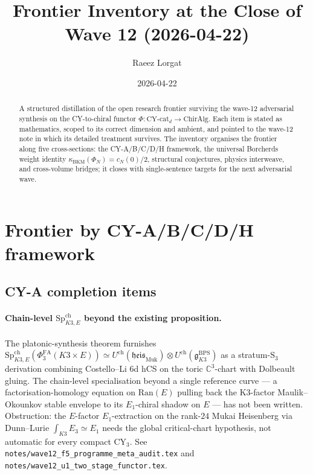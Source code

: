 \documentclass[11pt]{article}
\title{Frontier Inventory at the Close of Wave 12 (2026-04-22)}
\author{Raeez Lorgat}
\date{2026-04-22}
\providecommand{\C}{\mathbb{C}}
\providecommand{\Sp}{\mathrm{Sp}}
\providecommand{\kBKM}{\kappa_{\mathrm{BKM}}}
\providecommand{\Eone}{E_1}
\providecommand{\Ethree}{E_3}
\providecommand{\fg}{\mathfrak{g}}
\providecommand{\fheis}{\mathfrak{heis}}
\providecommand{\Phifa}{\Phi^{\mathrm{FA}}}
\begin{document}
\maketitle

\begin{abstract}
A structured distillation of the open research frontier surviving the
wave-12 adversarial synthesis on the CY-to-chiral functor $\Phi:
\mathrm{CY}\text{-cat}_d \to \mathrm{ChirAlg}$. Each item is stated
as mathematics, scoped to its correct dimension and ambient, and
pointed to the wave-12 note in which its detailed treatment survives.
The inventory organises the frontier along five cross-sections:
the CY-A/B/C/D/H framework, the universal Borcherds weight identity
$\kBKM(\Phi_N) = c_N(0)/2$, structural conjectures, physics interweave,
and cross-volume bridges; it closes with single-sentence targets for
the next adversarial wave.
\end{abstract}

\section{Frontier by CY-A/B/C/D/H framework}

\subsection{CY-A completion items}

\paragraph{Chain-level $\Sp^{\mathrm{ch}}_{K3, E}$ beyond the existing
proposition.} The platonic-synthesis theorem furnishes
$\Sp^{\mathrm{ch}}_{K3, E}(\Phifa_3(K3 \times E)) \simeq
U^{\mathrm{ch}}(\fheis_{\mathrm{Muk}}) \otimes U^{\mathrm{ch}}(\fg^{\mathrm{BPS}}_{K3})$
as a stratum-$\mathrm{S}_3$ derivation combining Costello--Li 6d hCS on
the toric $\C^3$-chart with Dolbeault gluing. The chain-level
specialisation beyond a single reference curve --- a factorisation-homology
equation on $\mathrm{Ran}(E)$ pulling back the K3-factor
Maulik--Okounkov stable envelope to its $\Eone$-chiral shadow on
$E$ --- has not been written. Obstruction: the $E$-factor $\Eone$-extraction
on the rank-$24$ Mukai Heisenberg via Dunn--Lurie
$\int_{K3}\Ethree \simeq \Eone$ needs the global critical-chart
hypothesis, not automatic for every compact CY$_3$. See
\texttt{notes/wave12\_f5\_programme\_meta\_audit.tex} and
\texttt{notes/wave12\_u1\_two\_stage\_functor.tex}.
\end{document}
